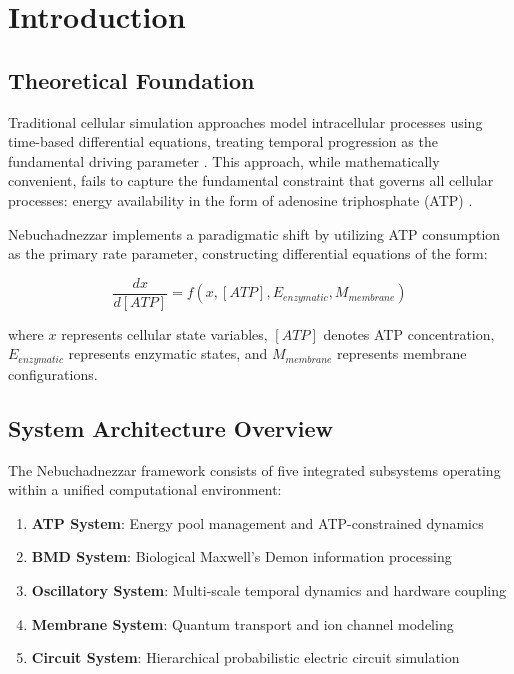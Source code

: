 \documentclass[12pt,a4paper]{article}
\begin{document}
\section{Introduction}

\subsection{Theoretical Foundation}

Traditional cellular simulation approaches model intracellular processes using time-based differential equations, treating temporal progression as the fundamental driving parameter \cite{alberts2014molecular}. This approach, while mathematically convenient, fails to capture the fundamental constraint that governs all cellular processes: energy availability in the form of adenosine triphosphate (ATP) \cite{nelson2017lehninger}.

Nebuchadnezzar implements a paradigmatic shift by utilizing ATP consumption as the primary rate parameter, constructing differential equations of the form:

\begin{equation}
\frac{dx}{d[ATP]} = f(x, [ATP], E_{enzymatic}, M_{membrane})
\end{equation}

where $x$ represents cellular state variables, $[ATP]$ denotes ATP concentration, $E_{enzymatic}$ represents enzymatic states, and $M_{membrane}$ represents membrane configurations.

\subsection{System Architecture Overview}

The Nebuchadnezzar framework consists of five integrated subsystems operating within a unified computational environment:

\begin{enumerate}
\item \textbf{ATP System}: Energy pool management and ATP-constrained dynamics
\item \textbf{BMD System}: Biological Maxwell's Demon information processing
\item \textbf{Oscillatory System}: Multi-scale temporal dynamics and hardware coupling
\item \textbf{Membrane System}: Quantum transport and ion channel modeling
\item \textbf{Circuit System}: Hierarchical probabilistic electric circuit simulation
\end{enumerate}
\end{document}
